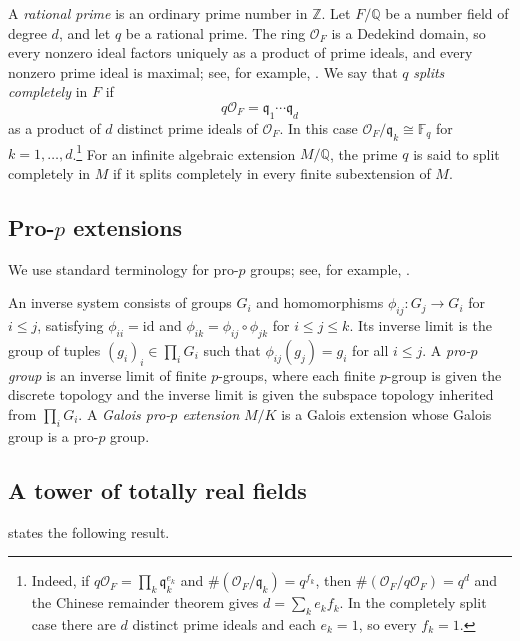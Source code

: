 A \emph{rational prime} is an ordinary prime number in \(\mathbb Z\).
Let \(F/\mathbb Q\) be a number field of degree \(d\), and let \(q\) be a rational prime.
The ring \(\mathcal O_F\) is a Dedekind domain, so every nonzero ideal factors uniquely as a product of prime ideals, and every nonzero prime ideal is maximal; see, for example, \cite[Theorem~3.29, Theorem~3.7, and Definition~3.3]{Mil20}.
We say that \(q\) \emph{splits completely} in \(F\) if
\[
q\mathcal O_F=\mathfrak q_1\cdots\mathfrak q_d
\]
as a product of \(d\) distinct prime ideals of \(\mathcal O_F\).
In this case \(\mathcal O_F/\mathfrak q_k\cong\mathbb F_q\) for \(k=1,\ldots,d\).\footnote{Indeed, if \(q\mathcal O_F=\prod_k\mathfrak q_k^{e_k}\) and \(\#(\mathcal O_F/\mathfrak q_k)=q^{f_k}\), then \(\#(\mathcal O_F/q\mathcal O_F)=q^d\) and the Chinese remainder theorem gives \(d=\sum_k e_kf_k\). In the completely split case there are \(d\) distinct prime ideals and each \(e_k=1\), so every \(f_k=1\).}
For an infinite algebraic extension \(M/\mathbb Q\), the prime \(q\) is said to split completely in \(M\) if it splits completely in every finite subextension of \(M\).

\subsection{Pro-\texorpdfstring{\(p\)}{p} extensions}
\label{subsec:pro-p-extensions}

We use standard terminology for pro-\(p\) groups; see, for example, \cite[Chapters~1, 2, and~4]{RZ10}.

An inverse system consists of groups \(G_i\) and homomorphisms \(\phi_{ij}:G_j\to G_i\) for \(i\le j\), satisfying \(\phi_{ii}=\mathrm{id}\) and \(\phi_{ik}=\phi_{ij}\circ\phi_{jk}\) for \(i\le j\le k\).
Its inverse limit is the group of tuples \((g_i)_i\in\prod_iG_i\) such that \(\phi_{ij}(g_j)=g_i\) for all \(i\le j\).
A \emph{pro-\(p\) group} is an inverse limit of finite \(p\)-groups, where each finite \(p\)-group is given the discrete topology and the inverse limit is given the subspace topology inherited from \(\prod_iG_i\).
A \emph{Galois pro-\(p\) extension} \(M/K\) is a Galois extension whose Galois group is a pro-\(p\) group.

\subsection{A tower of totally real fields}
\label{subsec:number-field-tower}

\cite[Proposition~2.3]{ABGLSSTWM26} states the following result.

